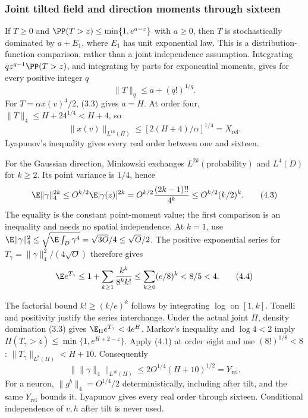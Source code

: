 \subsubsection{Joint tilted field and direction moments through sixteen}
If $T\ge0$ and $\PP(T>z)\le\min\{1,e^{a-z}\}$ with $a\ge0$, then
$T$ is stochastically dominated by $a+E_1$, where $E_1$ has unit
exponential law. This is a distribution-function comparison, rather than
a joint independence assumption. Integrating
$qz^{q-1}\PP(T>z)$, and integrating by parts for exponential moments,
gives for every positive integer $q$
\begin{equation}\|T\|_q\le a+(q!)^{1/q}.\tag{4.1}\end{equation}
For $T=\alpha x(v)^4/2$, (3.3) gives $a=H$. At order four,
$\|T\|_4\le H+24^{1/4}<H+4$, so
\begin{equation}
 \|x(v)\|_{L^{16}(\Pi)}\le[2(H+4)/\alpha]^{1/4}=X_{\mathrm{rel}}.\tag{4.2}
\end{equation}
Lyapunov's inequality gives every real order between one and sixteen.

For the Gaussian direction, Minkowski exchanges
$L^{2k}(\text{probability})$ and $L^4(D)$ for $k\ge2$.
Its point variance is $1/4$, hence
\begin{equation}
 \E\|\gamma\|_4^{2k}
 \le O^{k/2}\E|\gamma(z)|^{2k}
 =O^{k/2}\frac{(2k-1)!!}{4^k}
 \le O^{k/2}(k/2)^k.\tag{4.3}
\end{equation}
The equality is the constant point-moment value; the first comparison is
an inequality and needs no spatial independence. At $k=1$, use
$\E\|\gamma\|_4^2\le\sqrt{\E\int_D\gamma^4}
=\sqrt{3O}/4\le\sqrt O/2$. The positive exponential series for
$T_\gamma=\|\gamma\|_4^2/(4\sqrt O)$ therefore gives
\begin{equation}
 \E e^{T_\gamma}\le1+\sum_{k\ge1}\frac{k^k}{8^kk!}
 \le\sum_{k\ge0}(e/8)^k<8/5<4.\tag{4.4}
\end{equation}

The factorial bound $k!\ge(k/e)^k$ follows by integrating $\log$ on
$[1,k]$. Tonelli and positivity justify the series interchange.
Under the actual joint $\Pi$, density domination (3.3) gives
$\E_\Pi e^{T_\gamma}<4e^H$. Markov's inequality and $\log4<2$ imply
$\Pi(T_\gamma>z)\le\min\{1,e^{H+2-z}\}$.
Apply (4.1) at order eight and use $(8!)^{1/8}<8$:
$\|T_\gamma\|_{L^8(\Pi)}<H+10$. Consequently
\begin{equation}
 \|\|\gamma\|_4\|_{L^{16}(\Pi)}
 \le2O^{1/4}(H+10)^{1/2}=Y_{\mathrm{rel}}.\tag{4.5}
\end{equation}
For a neuron, $\|g^b\|_4=O^{1/4}/2$ deterministically, including after
tilt, and the same $Y_{\mathrm{rel}}$ bounds it. Lyapunov gives every
real order through sixteen. Conditional independence of $v,h$ after
tilt is never used.

